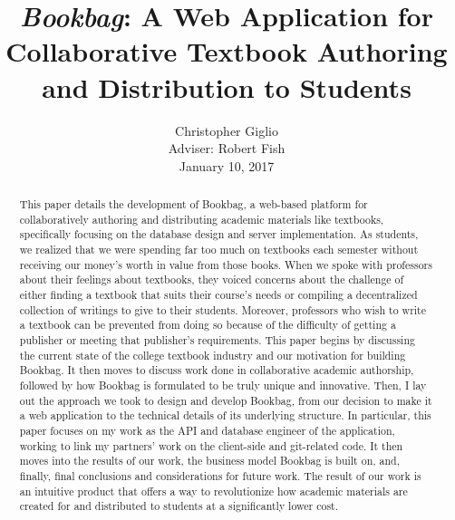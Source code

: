 \documentclass[pageno]{jpaper}
\begin{document}
\title{
\textit{Bookbag}: A Web Application for Collaborative Textbook Authoring and Distribution to Students}

\author{Christopher Giglio\\Adviser: Robert Fish\\January 10, 2017}

\date{}
\maketitle

\thispagestyle{empty}
\doublespacing
\vspace{8mm}

\begin{abstract}

This paper details the development of Bookbag, a web-based platform for collaboratively authoring and distributing academic materials like textbooks, specifically focusing on the database design and server implementation. As students, we realized that we were spending far too much on textbooks each semester without receiving our money's worth in value from those books. When we spoke with professors about their feelings about textbooks, they voiced concerns about the challenge of either finding a textbook that suits their course's needs or compiling a decentralized collection of writings to give to their students. Moreover, professors who wish to write a textbook can be prevented from doing so because of the difficulty of getting a publisher or meeting that publisher's requirements. This paper begins by discussing the current state of the college textbook industry and our motivation for building Bookbag. It then moves to discuss work done in collaborative academic authorship, followed by how Bookbag is formulated to be truly unique and innovative. Then, I lay out the approach we took to design and develop Bookbag, from our decision to make it a web application to the technical details of its underlying structure. In particular, this paper focuses on my work as the API and database engineer of the application, working to link my partners' work on the client-side and git-related code. It then moves into the results of our work, the business model Bookbag is built on, and, finally, final conclusions and considerations for future work. The result of our work is an intuitive product that offers a way to revolutionize how academic materials are created for and distributed to students at a significantly lower cost.
\end{abstract}
\end{document}
